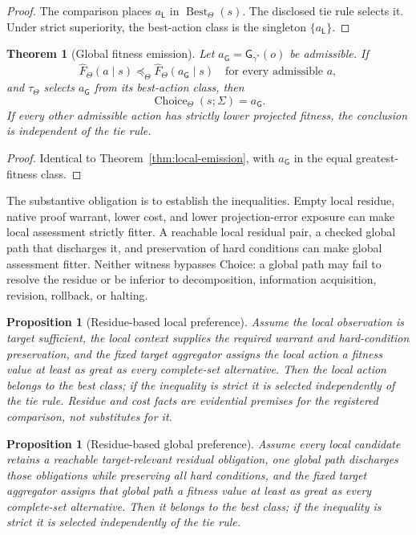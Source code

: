 \documentclass[10pt]{article}
\newtheorem{theorem}[definition]{Theorem}
\newtheorem{proposition}[definition]{Proposition}
\newcommand{\Choice}{\operatorname{Choice}}
\newcommand{\Loc}{\mathsf L}
\newcommand{\Glob}{\mathsf G}
\newcommand{\Config}{\Sigma}
\newcommand{\Best}{\operatorname{Best}}
\newcommand{\ProjFit}{\widehat F}
\newcommand{\Target}{\Theta}
\begin{document}
\begin{proof}
The comparison places $a_\Loc$ in $\Best_\Target(s)$.  The disclosed tie rule selects it.  Under strict superiority, the best-action class is the singleton $\{a_\Loc\}$.
\end{proof}

\begin{theorem}[Global fitness emission]\label{thm:global-emission}
Let $a_\Glob=\Glob_{\gamma^*}(o)$ be admissible.  If
\[
  \ProjFit_\Target(a\mid s)
  \preceq_\Target
  \ProjFit_\Target(a_\Glob\mid s)
  \quad\text{for every admissible }a,
\]
and $\tau_\Target$ selects $a_\Glob$ from its best-action class, then
\[
  \Choice_\Target(s;\Config)=a_\Glob.
\]
If every other admissible action has strictly lower projected fitness, the conclusion is independent of the tie rule.
\end{theorem}

\begin{proof}
Identical to Theorem~\ref{thm:local-emission}, with $a_\Glob$ in the equal greatest-fitness class.
\end{proof}

The substantive obligation is to establish the inequalities.  Empty local residue, native proof warrant, lower cost, and lower projection-error exposure can make local assessment strictly fitter.  A reachable local residual pair, a checked global path that discharges it, and preservation of hard conditions can make global assessment fitter.  Neither witness bypasses Choice: a global path may fail to resolve the residue or be inferior to decomposition, information acquisition, revision, rollback, or halting.

\begin{proposition}[Residue-based local preference]\label{prop:local-preference}
Assume the local observation is target sufficient, the local context supplies the required warrant and hard-condition preservation, and the fixed target aggregator assigns the local action a fitness value at least as great as every complete-set alternative.  Then the local action belongs to the best class; if the inequality is strict it is selected independently of the tie rule.  Residue and cost facts are evidential premises for the registered comparison, not substitutes for it.
\end{proposition}

\begin{proposition}[Residue-based global preference]\label{prop:global-preference}
Assume every local candidate retains a reachable target-relevant residual obligation, one global path discharges those obligations while preserving all hard conditions, and the fixed target aggregator assigns that global path a fitness value at least as great as every complete-set alternative.  Then it belongs to the best class; if the inequality is strict it is selected independently of the tie rule.
\end{proposition}
\end{document}
